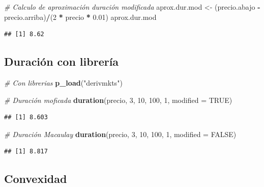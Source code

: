 \documentclass[12pt,]{book}
\newenvironment{Shaded}{\begin{snugshade}}{\end{snugshade}}
\newcommand{\KeywordTok}[1]{\textcolor[rgb]{0.13,0.29,0.53}{\textbf{#1}}}
\newcommand{\DataTypeTok}[1]{\textcolor[rgb]{0.13,0.29,0.53}{#1}}
\newcommand{\DecValTok}[1]{\textcolor[rgb]{0.00,0.00,0.81}{#1}}
\newcommand{\FloatTok}[1]{\textcolor[rgb]{0.00,0.00,0.81}{#1}}
\newcommand{\StringTok}[1]{\textcolor[rgb]{0.31,0.60,0.02}{#1}}
\newcommand{\CommentTok}[1]{\textcolor[rgb]{0.56,0.35,0.01}{\textit{#1}}}
\newcommand{\OtherTok}[1]{\textcolor[rgb]{0.56,0.35,0.01}{#1}}
\newcommand{\OperatorTok}[1]{\textcolor[rgb]{0.81,0.36,0.00}{\textbf{#1}}}
\newcommand{\NormalTok}[1]{#1}
\begin{document}
\begin{Shaded}
\begin{Highlighting}[]
\CommentTok{# Calculo de aproximación duración modificada}
\NormalTok{aprox.dur.mod <-}\StringTok{ }\NormalTok{(precio.abajo }\OperatorTok{-}\StringTok{ }\NormalTok{precio.arriba)}\OperatorTok{/}\NormalTok{(}\DecValTok{2} \OperatorTok{*}\StringTok{ }\NormalTok{precio }\OperatorTok{*}\StringTok{ }\FloatTok{0.01}\NormalTok{)}
\NormalTok{aprox.dur.mod}
\end{Highlighting}
\end{Shaded}

\begin{verbatim}
## [1] 8.62
\end{verbatim}

\subsection{Duración con librería}\label{duracion-con-libreria}

\begin{Shaded}
\begin{Highlighting}[]
\CommentTok{# Con librerias}
\KeywordTok{p_load}\NormalTok{(}\StringTok{"derivmkts"}\NormalTok{)}

\CommentTok{# Duración moficada }
\KeywordTok{duration}\NormalTok{(precio, }\DecValTok{3}\NormalTok{, }\DecValTok{10}\NormalTok{, }\DecValTok{100}\NormalTok{, }\DecValTok{1}\NormalTok{, }\DataTypeTok{modified =} \OtherTok{TRUE}\NormalTok{)}
\end{Highlighting}
\end{Shaded}

\begin{verbatim}
## [1] 8.603
\end{verbatim}

\begin{Shaded}
\begin{Highlighting}[]
\CommentTok{# Duración Macaulay}
\KeywordTok{duration}\NormalTok{(precio, }\DecValTok{3}\NormalTok{, }\DecValTok{10}\NormalTok{, }\DecValTok{100}\NormalTok{, }\DecValTok{1}\NormalTok{, }\DataTypeTok{modified =} \OtherTok{FALSE}\NormalTok{)}
\end{Highlighting}
\end{Shaded}

\begin{verbatim}
## [1] 8.817
\end{verbatim}

\subsection{Convexidad}\label{convexidad}
\end{document}
